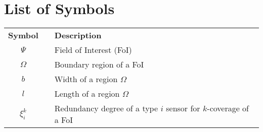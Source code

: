 \newpage
\chapter*{List of Symbols}
\begin{center}\centering
\begin{longtable}{cp{2cm}l}
\textbf{Symbol} & & \textbf{Description} \\
$\Psi$ & &  Field of Interest (FoI)\\ 
$\Omega$ & & Boundary region of a FoI \\
$b$ & & Width of a region $\Omega$ \\
$l$ & & Length of a region $\Omega$ \\
$\xi_i^k$& & Redundancy degree of a type $i$ sensor for $k$-coverage of a FoI 
\end{longtable}
\end{center}


 
